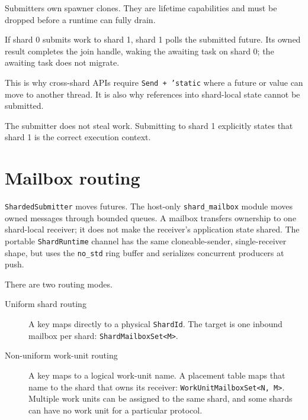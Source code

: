 Submitters own spawner clones. They are lifetime capabilities and must be
dropped before a runtime can fully drain.

If shard 0 submits work to shard 1, shard 1 polls the submitted future. Its
owned result completes the join handle, waking the awaiting task on shard 0;
the awaiting task does not migrate.

\begin{center}
\end{center}

This is why cross-shard APIs require \texttt{Send + 'static} where a future or
value can move to another thread. It is also why references into shard-local
state cannot be submitted.

The submitter does not steal work. Submitting to shard 1 explicitly states that
shard 1 is the correct execution context.

\section{Mailbox routing}

\texttt{ShardedSubmitter} moves futures. The host-only
\texttt{shard\_mailbox} module moves owned messages through bounded queues. A
mailbox transfers ownership to one shard-local receiver; it does not make the
receiver's application state shared. The portable \texttt{ShardRuntime}
channel has the same cloneable-sender, single-receiver shape, but uses the
\texttt{no\_std} ring buffer and serializes concurrent producers at push.

There are two routing modes.

\begin{description}
    \item[Uniform shard routing] A key maps directly to a physical
          \texttt{ShardId}. The target is one inbound mailbox per shard:
          \texttt{ShardMailboxSet<M>}.
    \item[Non-uniform work-unit routing] A key maps to a logical work-unit
          name. A placement table maps that name to the shard that owns its
          receiver: \texttt{WorkUnitMailboxSet<N, M>}. Multiple work units can
          be assigned to the same shard, and some shards can have no work unit
          for a particular protocol.
\end{description}

